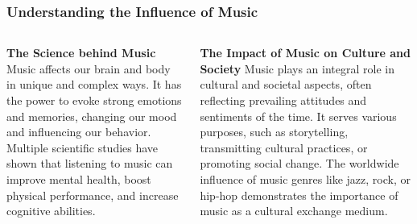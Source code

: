 \documentclass[5pt]{beamer}
\begin{document}
\begin{frame}
\frametitle{Understanding the Influence of Music}
\begin{columns}
\begin{column}{0.45\textwidth}
\begin{block}{\textbf{The Science behind Music}}
Music affects our brain and body in unique and complex ways. It has the power to evoke strong emotions and memories, changing our mood and influencing our behavior. Multiple scientific studies have shown that listening to music can improve mental health, boost physical performance, and increase cognitive abilities.
\end{block}
\end{column}
\begin{column}{0.45\textwidth}
\begin{block}{\textbf{The Impact of Music on Culture and Society}}
Music plays an integral role in cultural and societal aspects, often reflecting prevailing attitudes and sentiments of the time. It serves various purposes, such as storytelling, transmitting cultural practices, or promoting social change. The worldwide influence of music genres like jazz, rock, or hip-hop demonstrates the importance of music as a cultural exchange medium.
\end{block}
\end{column}
\end{columns}
\end{frame}
\end{document}
